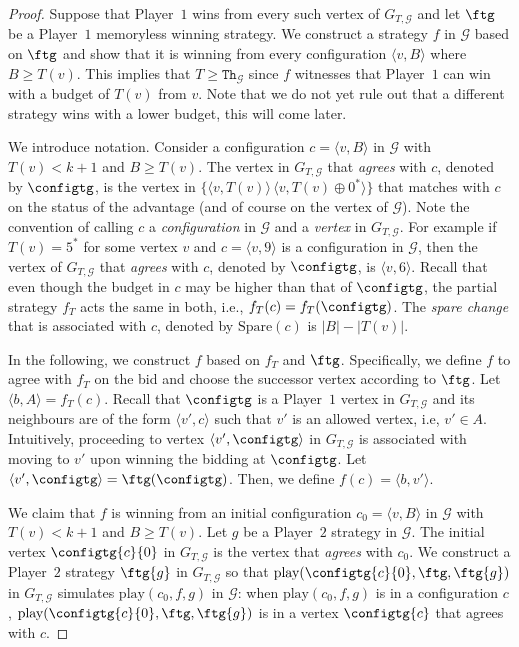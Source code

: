 \documentclass{theoretics}
\newcommand{\PO}{Player~$1$\xspace}
\newcommand{\PT}{Player~$2$\xspace}
\newcommand{\G}{{\mathcal G}}
\newcommand{\thresh}{\texttt{Th}\xspace}
\newcommand{\play}{\text{play}\xspace}
\newcommand{\Spare}{\text{Spare}\xspace}
\newcommand{\zug}[1]{\langle #1  \rangle}
\newcommand{\succb}[1]{#1 \oplus 0^*\xspace}
\begin{document}
\begin{proof}
	Suppose that \PO wins from every such vertex of \(G_{T, \G}\) and let \(\ftg\) be a \PO memoryless winning strategy. 
	We construct a strategy \(f\) in \(\G\) based on \(\ftg\) and show that it is winning from every configuration \(\zug{v, B}\) where \(B \geq T(v)\). 
	This implies that \(T \geq \thresh_{\G}\) since \(f\) witnesses that \PO can win with a budget of \(T(v)\) from \(v\). Note that we do not yet rule out that a different strategy wins with a lower budget, this will come later. 
	
	We introduce notation. 
	Consider a configuration \(c = \zug{v, B}\) in \(\G\) with $T(v) < k+1$ and \(B \geq T(v)\). 
	The vertex in \(G_{T, \G}\) that \emph{agrees} with \(c\), denoted by \(\configtg\), is the vertex in \(\{\zug{v, T(v)}\, \zug{v, \succb{T(v)}}\}\) that matches with \(c\) on the status of the advantage (and of course on the vertex of \(\G\)). Note the convention of calling $c$ a {\em configuration} in $\G$ and a {\em vertex} in $G_{T,\G}$. 
	For example if \(T(v) = 5^*\) for some vertex \(v\) and \(c = \zug{v, 9}\) is a configuration in \(\G\), then the vertex of \(G_{T, \G}\) that \emph{agrees} with \(c\), denoted by \(\configtg\), is \(\zug{v, 6}\).  
	Recall that even though the budget in \(c\) may be higher than that of \(\configtg\), the partial strategy \(f_T\) acts the same in both, i.e., \(f_T(c) = f_T(\configtg)\). 
	The \emph{spare change} that is associated with \(c\), denoted by \(\Spare(c)\) is \(|B| - |T(v)|\). 
	
	In the following, we construct \(f\) based on \(f_T\) and \(\ftg\). 
	Specifically, we define \(f\) to agree with \(f_T\) on the bid and choose the successor vertex according to \(\ftg\).
	Let \(\zug{b, A} = f_T(c)\).  
	Recall that \(\configtg\) is a \PO vertex in \(G_{T, \G}\) and its neighbours are of the form \(\zug{v', c}\) such that \(v'\) is an allowed vertex, i.e, \(v' \in A\). 
	Intuitively, proceeding to vertex \(\zug{v', \configtg}\) in \(G_{T, \G}\) is associated with moving to \(v'\) upon winning the bidding at \(\configtg\).
	Let \(\zug{v', \configtg} = \ftg(\configtg)\). 
	Then, we define \(f(c) = \zug{b, v'}\). 
	
	We claim that \(f\) is winning from an initial configuration \(c_0 = \zug{v, B}\) in \(\G\) with $T(v) < k+1$ and \(B \geq T(v)\). 
	Let \(g\) be a \PT strategy in \(\G\). 
	The initial vertex \(\configtg{c}{0}\) in \(G_{T, \G}\) is the vertex that \emph{agrees} with \(c_0\).
	We construct a \PT strategy \(\ftg{g}\) in \(G_{T, \G}\) so that \(\play(\configtg{c}{0}, \ftg, \ftg{g})\) in \(G_{T, \G}\) simulates \(\play(c_0, f, g)\) in \(\G\): when \(\play(c_0, f, g)\) is in a configuration \(c\), \(\play(\configtg{c}{0}, \ftg, \ftg{g})\) is in a vertex \(\configtg{c}\) that agrees with \(c\). 
	

\end{proof}
\end{document}
